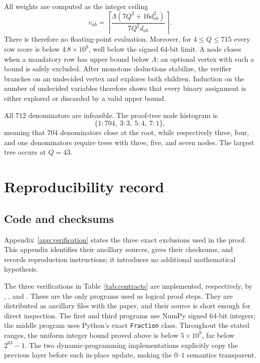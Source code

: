 \documentclass[11pt]{article}
\theoremstyle{definition}
\theoremstyle{remark}
\begin{document}
All weights are computed as the integer ceiling
\[
 v_{ab}=\left\lceil
 \frac{\Lambda(7Q^2+16d_{ab}^2)}{7Q^2d_{ab}}
 \right\rceil.
\]
There is therefore no floating-point evaluation.  Moreover, for
\(4\le Q\le715\) every row score is below \(4.8\times10^9\), well below the
signed \(64\)-bit limit.  A node closes when a mandatory row has upper bound
below \(\Lambda\); an optional vertex with such a bound is safely excluded.
After monotone deductions stabilize, the verifier branches on an undecided
vertex and explores both children.  Induction on the number of undecided
variables therefore shows that every binary assignment is either explored
or discarded by a valid upper bound.

All \(712\) denominators are infeasible.  The proof-tree node histogram is
\[
 \{1:704,\ 3:3,\ 5:4,\ 7:1\},
\]
meaning that \(704\) denominators close at the root, while respectively
three, four, and one denominators require trees with three, five, and seven
nodes.  The largest tree occurs at \(Q=43\).

\section{Reproducibility record}\label{app:reproducibility}

\subsection{Code and checksums}

Appendix~\ref{app:verification} states the three exact exclusions used in the
proof.  This appendix identifies their ancillary sources, gives their
checksums, and records reproduction instructions; it introduces no additional
mathematical hypothesis.

The three verifications in Table~\ref{tab:contracts} are implemented,
respectively, by ,
, and
.  These are the only programs used as
logical proof steps.  They are distributed as ancillary files with the
paper, and their source is short enough for direct inspection.
The first and third programs use NumPy signed \(64\)-bit integers; the middle
program uses Python's exact \texttt{Fraction} class.  Throughout the stated
ranges, the uniform integer bound proved above is below \(5\times10^9\), far
below \(2^{63}-1\).  The two dynamic-programming implementations
explicitly copy the previous layer before each in-place update, making the
\(0\)--\(1\) semantics transparent.
\end{document}

